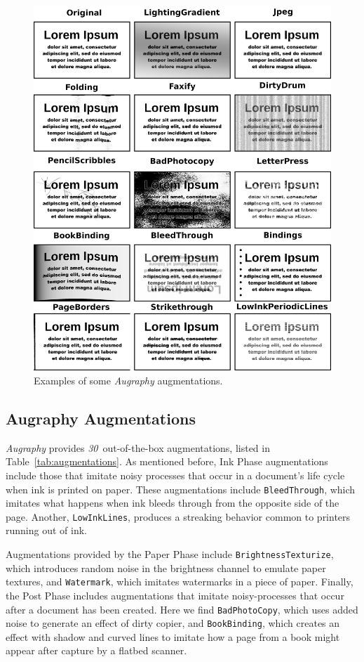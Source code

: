 \documentclass[runningheads]{llncs}
\newcommand{\numAugraphyAugmentations}{\emph{30}}
\begin{document}
\begin{figure}
\includegraphics[width=\textwidth]{figures/augmentation-matrix.png}
\caption{Examples of some \emph{Augraphy} augmentations.} \label{fig2}
\end{figure}

\subsection{Augraphy Augmentations}

\emph{Augraphy} provides \numAugraphyAugmentations ~out-of-the-box augmentations, listed in Table~\ref{tab:augmentations}.
As mentioned before, Ink Phase augmentations include those that imitate noisy processes that occur in a document's life cycle when ink is printed on paper.
These augmentations include \texttt{BleedThrough}, which imitates what happens when ink bleeds through from the opposite side of the page.
Another, \texttt{LowInkLines}, produces a streaking behavior common to printers running out of ink.

Augmentations provided by the Paper Phase include \texttt{BrightnessTexturize}, which introduces random noise in the brightness channel to emulate paper textures, and \texttt{Watermark}, which imitates watermarks in a piece of paper.
Finally, the Post Phase includes augmentations that imitate noisy-processes that occur after a document has been created.
Here we find \texttt{BadPhotoCopy}, which uses added noise to generate an effect of dirty copier, and \texttt{BookBinding}, which creates an effect with shadow and curved lines to imitate how a page from a book might appear after capture by a flatbed scanner.
\end{document}

